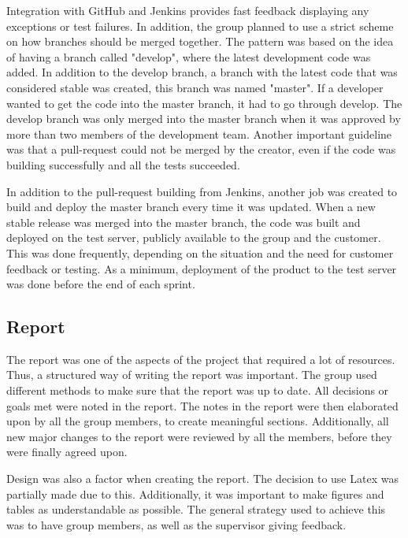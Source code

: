 Integration with GitHub and Jenkins provides fast feedback displaying any exceptions or test failures. In addition, the group planned to use a strict scheme on how branches should be merged together. The pattern was based on the idea of having a branch called "develop", where the latest development code was added. In addition to the develop branch, a branch with the latest code that was considered stable was created, this branch was named "master". If a developer wanted to get the code into the master branch, it had to go through develop. The develop branch was only merged into the master branch when it was approved by more than two members of the development team. Another important guideline was that a pull-request could not be merged by the creator, even if the code was building successfully and all the tests succeeded. 

In addition to the pull-request building from Jenkins, another job was created to build and deploy the master branch every time it was updated. When a new stable release was merged into the master branch, the code was built and deployed on the test server, publicly available to the group and the customer. This was done frequently, depending on the situation and the need for customer feedback or testing. As a minimum, deployment of the product to the test server was done before the end of each sprint.

\subsection{Report}
\label{subsec:process_and_methodology-process_methodology-report}

The report was one of the aspects of the project that required a lot of resources. Thus, a structured way of writing the report was important. The group used different methods to make sure that the report was up to date. All decisions or goals met were noted in the report. The notes in the report were then elaborated upon by all the group members, to create meaningful sections. Additionally, all new major changes to the report were reviewed by all the members, before they were finally agreed upon. 

Design was also a factor when creating the report. The decision to use Latex was partially made due to this. Additionally, it was important to make figures and tables as understandable as possible. The general strategy used to achieve this was to have group members, as well as the supervisor giving feedback.

